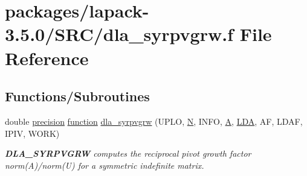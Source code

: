 \hypertarget{dla__syrpvgrw_8f}{}\section{packages/lapack-\/3.5.0/\+S\+R\+C/dla\+\_\+syrpvgrw.f File Reference}
\label{dla__syrpvgrw_8f}
\subsection*{Functions/\+Subroutines}
\begin{DoxyCompactItemize}
\item 
double \hyperlink{numinquire_8h_a2c8e616467665d0b2814d4c1589ba74e}{precision} \hyperlink{afunc_8m_a7b5e596df91eadea6c537c0825e894a7}{function} \hyperlink{group__doubleSYcomputational_ga6bdb80a89be64f81c3ac88863e49e6da}{dla\+\_\+syrpvgrw} (U\+P\+L\+O, \hyperlink{polmisc_8c_a0240ac851181b84ac374872dc5434ee4}{N}, I\+N\+F\+O, \hyperlink{classA}{A}, \hyperlink{example__user_8c_ae946da542ce0db94dced19b2ecefd1aa}{L\+D\+A}, A\+F, L\+D\+A\+F, I\+P\+I\+V, W\+O\+R\+K)
\begin{DoxyCompactList}\small\item\em {\bfseries D\+L\+A\+\_\+\+S\+Y\+R\+P\+V\+G\+R\+W} computes the reciprocal pivot growth factor norm(\+A)/norm(U) for a symmetric indefinite matrix. \end{DoxyCompactList}\end{DoxyCompactItemize}
